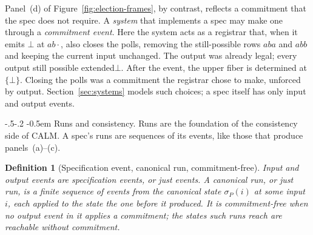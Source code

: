 \documentclass[sigconf]{cidr-2027}
\makeatletter
\newtheorem{definition}{Definition}
\theoremstyle{remark}
\renewcommand\paragraph{\@startsection{paragraph}{4}{\z@}%
  {-.5\baselineskip \@plus -2\p@ \@minus -.2\p@}%
  {-0.5em}%
  {\normalfont\bfseries}}
\newcommand{\commitment}{commitment\xspace}
\newcommand{\Commitment}{Commitment\xspace}
\newcommand{\inrel}{extends\xspace}          %
\newcommand{\indesc}{input extension\xspace} %
\newcommand{\outrel}{extends\xspace}          %
\newcommand{\outrelpast}{extended\xspace}     %
\newcommand{\outnoun}{output extension\xspace}%
\makeatother
\begin{document}
Panel~(d) of Figure~\ref{fig:election-frames}, by contrast, reflects a
\commitment that the spec does not require.  A \emph{system} that implements a
spec may make one through a \emph{\commitment event}.  Here the system acts as
a registrar that, when it emits $\bot$ at $ab\cdot$, also closes the polls,
removing the still-possible rows $aba$ and $abb$ and keeping the current input
unchanged.  The output was already legal; every output still possible
\outrelpast $\bot$.  After the event, the upper fiber is determined at
$\{\bot\}$.  Closing the polls was a \commitment the registrar chose to make, unforced by output.
Section~\ref{sec:systems} models such choices; a spec itself has only input and
output events.

\paragraph{Runs and consistency.}
Runs are the foundation of the consistency side of CALM.  A spec's runs are
sequences of its events, like those that produce panels~(a)--(c).

\begin{definition}[Specification event, canonical run, \commitment-free]
\label{def:run}
Input and output events are \emph{specification events}, or just \emph{events}.  A \emph{canonical run}, or just \emph{run}, is a
finite sequence of events from the
canonical state $\sigma_P(i)$ at some input $i$, each applied to the state the one before it produced.  It is
\emph{\commitment-free} when no output event in it applies a \commitment; the
states such runs reach are \emph{reachable without \commitment}.
\end{definition}


\end{document}
